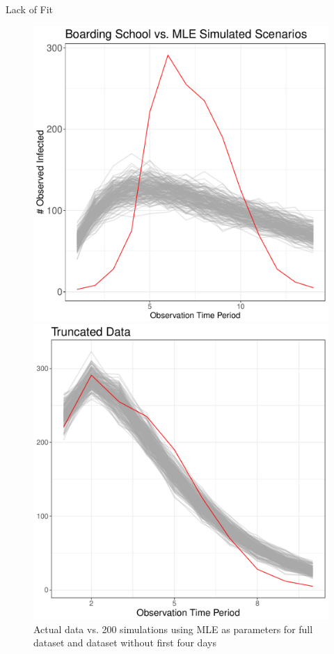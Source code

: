 \documentclass[10pt,table]{beamer}
\begin{document}
\begin{frame}{Lack of Fit}
\begin{figure}
\centering
\begin{minipage}{.4\textwidth}
\includegraphics[width=1\linewidth]{LackOfFit.pdf}
\end{minipage}%
\begin{minipage}{.4\textwidth}

\centering
\includegraphics[width=1\linewidth]{BetterFit.pdf}
\end{minipage}
\caption{Actual data vs. 200 simulations using MLE as parameters for full dataset and dataset without first four days}
\label{plot1}
\end{figure}

\end{frame}
\end{document}

